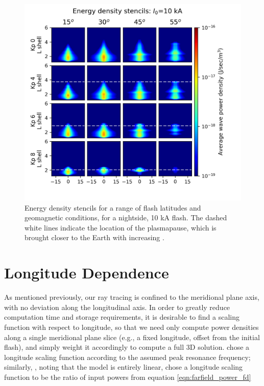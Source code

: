 \begin{figure}[h!]
\begin{center}
\includegraphics{figures/wave_energy_vs_L_stencils.png}
\caption[Energy density stencils]{Energy density stencils for a range of flash latitudes and geomagnetic conditions, for a nightside, 10 kA flash. The dashed white lines indicate the location of the plasmapause, which is brought closer to the Earth with increasing \kp{}.}
\label{fig:energy_stencils}
\end{center}
\end{figure}

\section{Longitude Dependence}
\label{section:longitude_scaling}
As mentioned previously, our ray tracing is confined to the meridional plane axis, with no deviation along the longitudinal axis. In order to greatly reduce computation time and storage requirements, it is desirable to find a scaling function with respect to longitude, so that we need only compute power densities along a single meridional plane slice (e.g., a fixed longitude, offset from the initial flash), and simply weight it accordingly to compute a full 3D solution. \cite{Lauben1998} chose a longitude scaling function according to the assumed peak resonance frequency; similarly, \cite{Bortnik2005}, noting that the model is entirely linear, chose a longitude scaling function to be the ratio of input powers from equation \eqref{eqn:farfield_power_fd}

